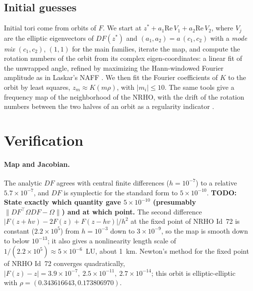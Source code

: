 \documentclass[11pt]{article}
\newcommand{\todo}[1]{\textbf{TODO: #1}}
\begin{document}
\subsection{Initial guesses}\label{sec:guess}
Initial tori come from orbits of $F$. We start at $z^* + a_1\mathrm{Re}\,V_1 + a_2\mathrm{Re}\,V_2$,
where $V_j$ are the elliptic eigenvectors of $DF(z^*)$ and $(a_1,a_2) = a\,(c_1,c_2)$ with a
\emph{mode mix} $(c_1,c_2)$, $(1,1)$ for the main families, iterate the map, and compute the rotation
numbers of the orbit from its complex eigen-coordinates: a linear fit of the unwrapped angle,
refined by maximizing the Hann-windowed Fourier amplitude as in Laskar's NAFF
\cite{laskar1990chaotic,laskar1993naff}. We then fit the Fourier coefficients of $K$ to the orbit
by least squares, $z_m \approx K(m\rho)$, with $|m_i|\le 10$. The same tools give a frequency map
of the neighborhood of the NRHO, with the drift of the rotation numbers between the two halves of
an orbit as a regularity indicator \cite{laskar1993naff}.

\section{Verification}\label{sec:verification}

\paragraph{Map and Jacobian.} The analytic $DF$ agrees with central finite differences
($h=10^{-7}$) to a relative $5.7\times10^{-7}$, and $DF$ is symplectic for the standard form to
$5\times10^{-10}$. \todo{State exactly which quantity gave $5\times10^{-10}$ (presumably
$\|DF^\top\Omega DF-\Omega\|$) and at which point.} The second difference
$|F(z+hv)-2F(z)+F(z-hv)|/h^2$ at the fixed point of NRHO Id~72 is constant ($2.2\times10^5$) from
$h=10^{-3}$ down to $3\times10^{-9}$, so the map is smooth down to below $10^{-13}$; it also gives
a nonlinearity length scale of $1/(2.2\times10^5)\approx 5\times10^{-6}$~LU, about 1~km. Newton's
method for the fixed point of NRHO Id~72 converges quadratically,
$|F(z)-z| = 3.9\times10^{-7},\ 2.5\times10^{-11},\ 2.7\times10^{-14}$; this orbit is
elliptic-elliptic with $\rho = (0.343616643, 0.173806970)$.
\end{document}
